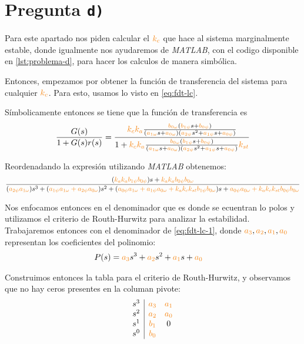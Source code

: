 \section{Pregunta \texttt{d)}}\label{pregunta-d}

Para este apartado nos piden calcular el $\nara{k_{c}}$ que hace al sistema
marginalmente estable, donde igualmente nos ayudaremos de \textit{MATLAB}, con
el codigo disponible en \autoref{lst:problema-d}, para hacer los calculos
de manera simbólica.

Entonces, empezamos por obtener la función de transferencia del sistema para
cualquier $\nara{k_{c}}$. Para esto, usamos lo visto en \eqref{eq:fdt-lc}.

Símbolicamente entonces se tiene que la función de transferencia es
\begin{equation}
    \frac{G(s)}{1 + G(s)r(s)} = \dfrac{\nara{k_ck_a} \frac{\nara{\nara{b_{0\omega}}}\left(\nara{b_{1\psi}}s + \nara{b_{0\psi}}\right)}
    {\left(\nara{a_{1\omega}}s + \nara{a_{0\omega}}\right)\left(\nara{a_{2\psi}}s^{2} + \nara{a_{1\psi}}s + \nara{a_{0\psi}}\right)}}{1+\nara{k_ck_a} \frac{\nara{\nara{b_{0\omega}}}\left(\nara{b_{1\psi}}s + \nara{b_{0\psi}}\right)}
    {\left(\nara{a_{1\omega}}s + \nara{a_{0\omega}}\right)\left(\nara{a_{2\psi}}s^{2} + \nara{a_{1\psi}}s + \nara{a_{0\psi}}\right)}\nara{k_{st}}}
\end{equation}

Reordenadando la expresión utilizando \textit{MATLAB} obtenemos:
\begin{equation}\label{eq:fdt-lc-1}
    \frac{(\nara{k_a k_a b_{1\psi} b_{0\psi}})s + \nara{k_a k_a b_{0\psi} b_{0\omega}}}
    {(\nara{a_{2\psi} a_{1\omega}})s^3 + (\nara{a_{1\psi} a_{1\omega} + a_{2\psi} a_{0\omega}})s^2 + (\nara{a_{0\psi} a_{1\omega} + a_{1\psi} a_{0\omega} + k_a k_c k_{st} b_{1\psi} b_{0\omega}})s + \nara{a_{0\psi} a_{0\omega} + k_a k_c k_{st} b_{0\psi} b_{0\omega}}}
\end{equation}

Nos enfocamos entonces en el denominador que es donde se ecuentran lo polos y
utilizamos el criterio de Routh-Hurwitz para analizar la estabilidad. Trabajaremos
entonces con el denominador de \eqref{eq:fdt-lc-1}, donde $\nara{a_3},\nara{a_2},\nara{a_1},\nara{a_0}$
representan los coeficientes del polinomio:
\begin{align}
    P(s) = \nara{a_3} s^3 + \nara{a_2} s^2 + \nara{a_1} s + \nara{a_0} &
\end{align}

Construimos entonces la tabla para el criterio de Routh-Hurwitz, y observamos
que no hay ceros presentes en la columan pivote:
\begin{equation}
  \begin{array}{c|cc}
    s^3 & \nara{a_3} & \nara{a_1} \\
    s^2 & \nara{a_2} & \nara{a_0} \\
    s^1 & \nara{b_1} & 0 \\
    s^0 & \nara{b_0} & 
  \end{array}
\end{equation}

